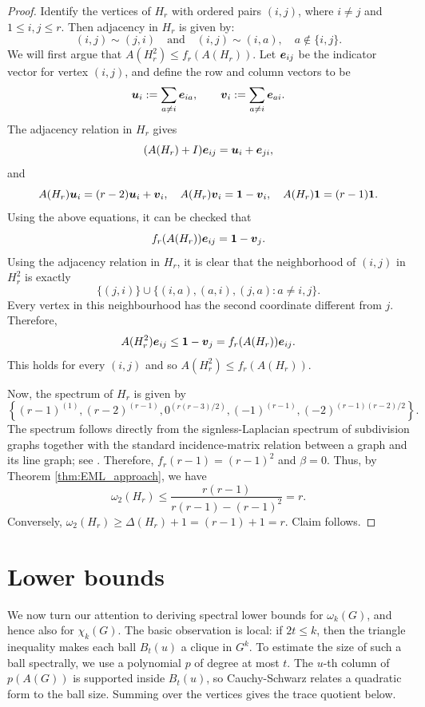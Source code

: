 \documentclass[11pt]{article}
\theoremstyle{plain}
\numberwithin{equation}{section}
\def\e{\mbox{\boldmath $e$}}
\def\uvec{\mbox{\boldmath $u$}}
\def\vvec{\mbox{\boldmath $v$}}
\def\1{\mbox{\boldmath $1$}}
\begin{document}
\begin{proof}
Identify the vertices of $H_r$ with ordered pairs $(i,j)$, where $i\ne j$ and $1\le i,j\le r$. Then adjacency in $H_r$ is given by:
\[ (i,j)\sim (j,i)\quad \text{and}\quad (i,j)\sim (i,a), \quad a\notin \{i,j\}.\]
We will first argue that $A(H_r^2)\le f_r(A(H_r))$. Let $\e_{ij}$ be the indicator vector for vertex $(i,j)$, and define the row and column vectors to be 
\[ \uvec_i:= \sum_{a\ne i}\e_{ia}, \qquad \vvec_i := \sum_{a\ne i}\e_{ai}.\]
The adjacency relation in $H_r$ gives
\begin{equation}
    (A(H_r)+I)\e_{ij} = \uvec_i + \e_{ji},
\end{equation}
and 
\begin{equation}
    A(H_r)\uvec_i = (r-2)\uvec_i + \vvec_i, \quad A(H_r)\vvec_i = \1 - \vvec_i, \quad A(H_r)\1 = (r-1)\1. 
\end{equation}
Using the above equations, it can be checked that
\[ f_r(A(H_r))\e_{ij} = \1 - \vvec_{j}.\]
Using the adjacency relation in $H_r$, it is clear that the neighborhood of $(i,j)$ in $H_r^2$ is exactly 
\[\{(j, i)\}\cup \{(i, a), (a, i), (j, a): a\ne i,j\}.\]
Every vertex in this neighbourhood has the second coordinate different from $j$. Therefore, 
\[A(H_r^2)\e_{ij} \le \1 - \vvec_j = f_r(A(H_r))\e_{ij}.\]
This holds for every $(i,j)$ and so $A(H_r^2)\le f_r(A(H_r))$.

Now, the spectrum of $H_r$ is given by 
\[\left\{(r-1)^{(1)}, (r-2)^{(r-1)}, 0^{(r(r-3)/2)}, (-1)^{(r-1)}, (-2)^{(r-1)(r-2)/2}\right\}.\] 
The spectrum follows directly from the signless-Laplacian spectrum of subdivision graphs together with the standard incidence-matrix relation between a graph and its line graph; see \cite{Barik_Kalita_Pati_Sahoo_2018}. Therefore, $f_r(r-1) = (r-1)^2$ and $\beta = 0$. Thus, by Theorem \ref{thm:EML_approach}, we have 
\[\omega_2(H_r) \le \frac{r(r-1)}{r(r-1) - (r-1)^2} = r.\]
Conversely, $\omega_2(H_r)\ge \Delta(H_r) + 1 = (r-1) + 1 = r$. Claim follows. 
\end{proof}

\section{Lower bounds}\label{sec:lower_bounds}


We now turn our attention to deriving spectral lower bounds for $\omega_k(G)$, and hence also for $\chi_k(G)$. The basic observation is local: if $2t\le k$, then the triangle inequality makes each ball $B_t(u)$ a clique in $G^k$. To estimate the size of such a ball spectrally, we use a polynomial $p$ of degree at most $t$. The $u$-th column of $p(A(G))$ is supported inside $B_t(u)$, so Cauchy-Schwarz relates a quadratic form to the ball size. Summing over the vertices gives the trace quotient below.
\end{document}
